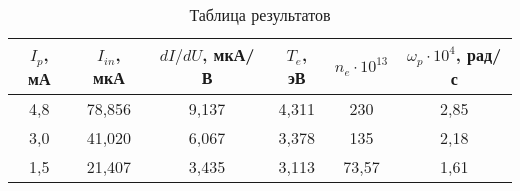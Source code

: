 \begin{table}[h!]
    \centering
    \begin{tabular}{|c|c|c|c|c|c|}
    \hline
    $I_p$, мА & $I_{in}$, мкА & $dI/dU$, мкА/В & $T_e$, эВ & $n_e \cdot 10^{13}$ & $\omega_p \cdot 10^4$, рад/с \\ \hline
    4,8       & 78,856      & 9,137          & 4,311     & 230                 & 2,85                           \\ \hline
    3,0       & 41,020      & 6,067          & 3,378     & 135                 & 2,18                           \\ \hline
    1,5       & 21,407      & 3,435          & 3,113     & 73,57               & 1,61                           \\ \hline
    \end{tabular}
    \caption{Таблица результатов}
\end{table}